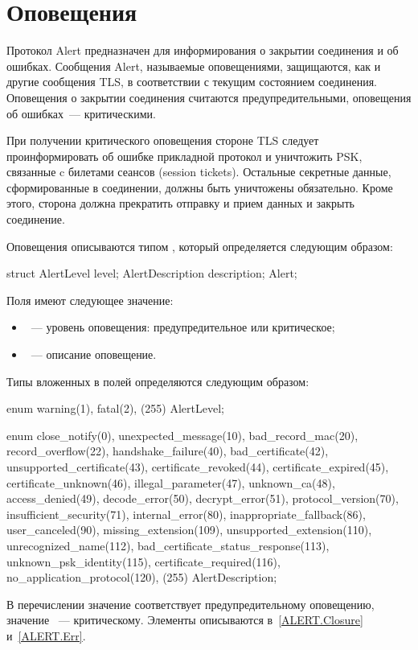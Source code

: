 \section{Оповещения}\label{ALERT.Alerts}

Протокол Alert предназначен для информирования о закрытии соединения и об
ошибках. Сообщения Alert, называемые оповещениями, защищаются, как и другие
сообщения TLS, в соответствии с текущим состоянием соединения.
%
Оповещения о закрытии соединения считаются предупредительными,
оповещения об ошибках~--- критическими.

При получении критического оповещения стороне TLS следует проинформировать об
ошибке прикладной протокол и уничтожить PSK, связанные c билетами сеансов
(session tickets).
%
Остальные секретные данные, сформированные в соединении, должны быть уничтожены 
обязательно. Кроме этого, сторона должна прекратить отправку и прием данных и 
закрыть соединение.

Оповещения описываются типом , который определяется следующим образом:

\begin{codeblock}
struct {
  AlertLevel level;
  AlertDescription description;
} Alert;
\end{codeblock}

Поля  имеют следующее значение:
\begin{itemize}
\item
{}~--- уровень оповещения: предупредительное или критическое;
\item
{}~--- описание оповещение.
\end{itemize}

Типы вложенных в  полей определяются следующим образом:

\begin{codeblock}
enum { warning(1), fatal(2), (255) } AlertLevel;

enum {
  close_notify(0),
  unexpected_message(10),
  bad_record_mac(20),
  record_overflow(22),
  handshake_failure(40),
  bad_certificate(42),
  unsupported_certificate(43),
  certificate_revoked(44),
  certificate_expired(45),
  certificate_unknown(46),
  illegal_parameter(47),
  unknown_ca(48),
  access_denied(49),
  decode_error(50),
  decrypt_error(51),
  protocol_version(70),
  insufficient_security(71),
  internal_error(80),
  inappropriate_fallback(86),
  user_canceled(90),
  missing_extension(109),
  unsupported_extension(110),
  unrecognized_name(112),
  bad_certificate_status_response(113),
  unknown_psk_identity(115),
  certificate_required(116),
  no_application_protocol(120),
  (255)
} AlertDescription;
\end{codeblock}

В перечислении  значение  соответствует 
предупредительному оповещению, значение ~--- критическому. 
Элементы  описываются в~\ref{ALERT.Closure} 
и~\ref{ALERT.Err}.
